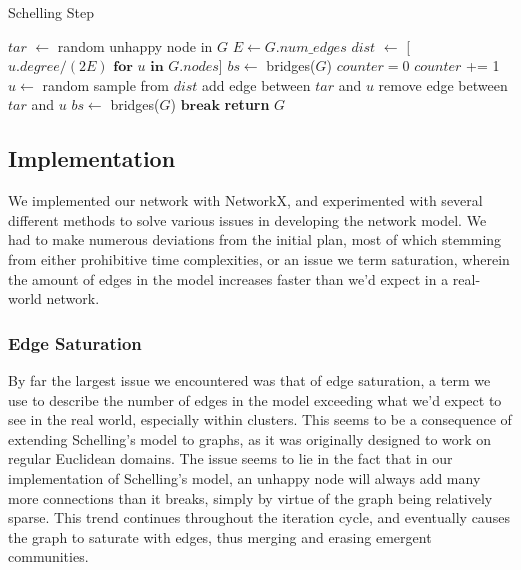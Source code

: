 \documentclass[12pt,twoside]{report}
\begin{document}
\begin{algorithm}
\caption{Schelling Step}
\begin{algorithmic}
\State $tar$ $\gets$ random unhappy node in $G$
\State $E \gets G.num\_edges$
\State $dist$ $\gets$ [$u.degree / (2E) \textbf{ for } u \textbf{ in } G.nodes$]
\State $bs \gets $ bridges($G$) 
\State $counter = 0$
\State $counter$ += 1
\State $u \gets$ random sample from $dist$
\State add edge between $tar$ and $u$
\EndIf
{}
\State remove edge between $tar$ and $u$
\State $bs \gets $ bridges($G$) 
\EndIf
{} 
\State $\textbf{break}$
\EndIf
\EndWhile
\State \textbf{return} $G$
\EndFunction
\end{algorithmic}
\end{algorithm}

\subsection{Implementation}

We implemented our network with NetworkX, and experimented with several different methods to solve various issues in developing the network model. We had to make numerous deviations from the initial plan, most of which stemming from either prohibitive time complexities, or an issue we term saturation, wherein the amount of edges in the model increases faster than we'd expect in a real-world network. \\

\subsubsection{Edge Saturation}

By far the largest issue we encountered was that of edge saturation, a term we use to describe the number of edges in the model exceeding what we'd expect to see in the real world, especially within clusters. This seems to be a consequence of extending Schelling's model to graphs, as it was originally designed to work on regular Euclidean domains. The issue seems to lie in the fact that in our implementation of Schelling's model, an unhappy node will always add many more connections than it breaks, simply by virtue of the graph being relatively sparse. This trend continues throughout the iteration cycle, and eventually causes the graph to saturate with edges, thus merging and erasing emergent communities. \\
\end{document}
